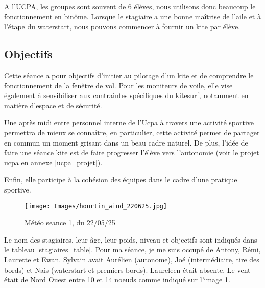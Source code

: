 \documentclass[11pt,a4paper]{report}
\begin{document}
A l'UCPA, les groupes sont souvent de 6 élèves, nous
utilisons donc beaucoup le fonctionnement en bin\^ome. 
Lorsque le stagiaire a une bonne maîtrise de l'aile et
à l'étape du waterstart, nous pouvons commencer à fournir
un kite par élève.
\subsection{Objectifs}
Cette séance a pour objectifs d’initier au pilotage d’un kite et
de comprendre le fonctionnement de la fenêtre de vol. 
Pour les moniteurs de voile, elle vise également à 
sensibiliser aux contraintes spécifiques du kitesurf, 
notamment en matière d’espace et de sécurité.
 
Une après midi entre personnel interne de l'Ucpa à travers une 
activité sportive permettra  de mieux se connaître, 
en particulier, cette activité permet de partager en commun
un moment grisant dans un beau cadre naturel. De plus, l'idée
de faire une séance kite est de faire progresser l'élève vers 
l'autonomie (voir le projet ucpa en annexe \ref{ucpa_projet}).

Enfin, elle participe à la cohésion des équipes
dans le cadre d'une pratique sportive.

\begin{figure}
\centering
\texttt{[image: Images/hourtin\_wind\_220625.jpg]} 
\caption{Météo seance 1, du 22/05/25\label{meteo}}
\end{figure}


Le nom des stagiaires, leur \^age, leur poids, niveau et objectifs sont
indiqués dans le tableau \ref{stagiaires_table}.
Pour ma séance, je me suis occupé de Antony, Rémi, Laurette et Ewan.
Sylvain avait Aurélien (autonome), Joé (intermédiaire, tire des bords)
et Nais (waterstart et premiers bords).
Laureleen était absente. Le vent était de Nord Ouest entre 
10 et 14 noeuds comme indiqué sur l'image \ref{meteo}.
\end{document}
